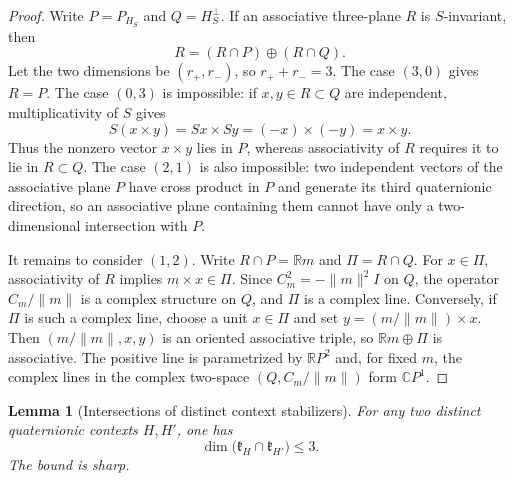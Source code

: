 \documentclass[11pt,a4paper]{article}
\newtheorem{lemma}[lemma]{Lemma}
\newcommand{\RR}{\mathbb R}
\newcommand{\CC}{\mathbb C}
\begin{document}
\begin{proof}
Write $P=P_{H_S}$ and $Q=H_S^\perp$.  If an associative three-plane $R$ is $S$-invariant, then
\[
R=(R\cap P)\oplus(R\cap Q).
\]
Let the two dimensions be $(r_+,r_-)$, so $r_++r_-=3$.  The case $(3,0)$ gives $R=P$.  The case $(0,3)$ is impossible: if $x,y\in R\subset Q$ are independent, multiplicativity of $S$ gives
\[
S(x\times y)=Sx\times Sy=(-x)\times(-y)=x\times y.
\]
Thus the nonzero vector $x\times y$ lies in $P$, whereas associativity of $R$ requires it to lie in $R\subset Q$.  The case $(2,1)$ is also impossible: two independent vectors of the associative plane $P$ have cross product in $P$ and generate its third quaternionic direction, so an associative plane containing them cannot have only a two-dimensional intersection with $P$.

It remains to consider $(1,2)$.  Write $R\cap P=\RR m$ and $\Pi=R\cap Q$.  For $x\in\Pi$, associativity of $R$ implies $m\times x\in\Pi$.  Since $C_m^2=-\lVert m\rVert^2 I$ on $Q$, the operator $C_m/\lVert m\rVert$ is a complex structure on $Q$, and $\Pi$ is a complex line.  Conversely, if $\Pi$ is such a complex line, choose a unit $x\in\Pi$ and set $y=(m/\lVert m\rVert)\times x$.  Then $(m/\lVert m\rVert,x,y)$ is an oriented associative triple, so $\RR m\oplus\Pi$ is associative.  The positive line is parametrized by $\RR P^2$ and, for fixed $m$, the complex lines in the complex two-space $(Q,C_m/\lVert m\rVert)$ form $\CC P^1$.
\end{proof}

\begin{lemma}[Intersections of distinct context stabilizers]
\label{lem:nonfixed-context-bound}
For any two distinct quaternionic contexts $H,H'$, one has
\[
\dim\bigl(\mathfrak k_H\cap\mathfrak k_{H'}\bigr)\le3.
\]
The bound is sharp.
\end{lemma}
\end{document}
